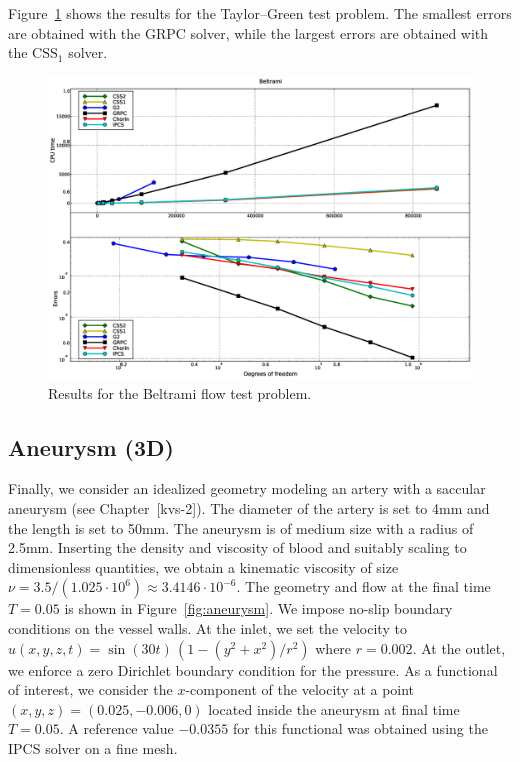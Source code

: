 Figure~\ref{fig:beltrami_res} shows the results for the Taylor--Green
test problem. The smallest errors are obtained with the GRPC solver,
while the largest errors are obtained with the $\mathrm{CSS}_1$
solver.

\begin{figure}
  \begin{center}
    \includegraphics[width=14cm]{chapters/kvs-1/eps/new_beltrami_res.eps}
    \caption{Results for the Beltrami flow test problem.}
    \label{fig:beltrami_res}
  \end{center}
\end{figure}

\subsection{Aneurysm (3D)}

Finally, we consider an idealized geometry modeling an artery with a
saccular aneu\-rysm (see Chapter~[kvs-2]). The diameter of the artery
is set to 4mm and the length is set to 50mm. The aneurysm is of medium
size with a radius of 2.5mm. Inserting the density and viscosity of
blood and suitably scaling to dimensionless quantities, we obtain a
kinematic viscosity of size $\nu = 3.5 / (1.025 \cdot 10^6) \approx
3.4146 \cdot 10^{-6}$. The geometry and flow at the final time $T =
0.05$ is shown in Figure~\ref{fig:aneurysm}. We impose no-slip
boundary conditions on the vessel walls. At the inlet, we set the
velocity to $u(x, y, z, t) = \sin(30 t) \, (1 - (y^2 + x^2) / r^2)$
where $r = 0.002$. At the outlet, we enforce a zero Dirichlet boundary
condition for the pressure. As a functional of interest, we consider
the $x$-component of the velocity at a point $(x, y, z) = (0.025,
-0.006, 0)$ located inside the aneurysm at final time $T = 0.05$. A
reference value $-0.0355$ for this functional was obtained using the
IPCS solver on a fine mesh.

